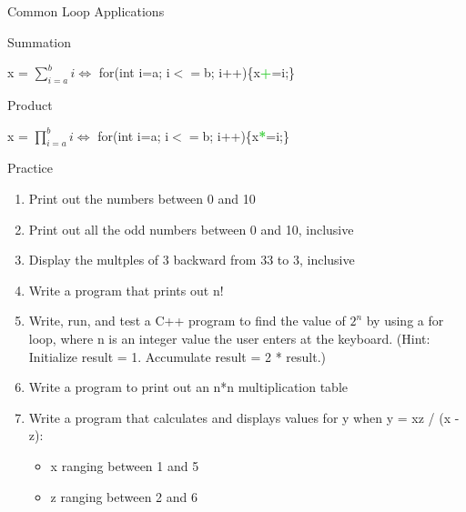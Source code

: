 \documentclass[xcolor={dvipsnames}]{beamer}
\begin{document}
\begin{frame}{Common Loop Applications}
\Large
	\begin{block}{Summation}
		\begin{center}
		x = $\displaystyle \sum^{b}_{i=a} i \Leftrightarrow$ for(int i=a; i$<=$b; i++)\{x\textcolor{LimeGreen}{\textbf{+}}=i;\}
		\end{center}
	\end{block}
	\pause
	\begin{block}{Product}
		\begin{center}
		x = $\displaystyle \prod^{b}_{i=a} i \Leftrightarrow$ for(int i=a; i$<=$b; i++)\{x\textcolor{LimeGreen}{\textbf{*}}=i;\}
		\end{center}
	\end{block}
\end{frame}


\begin{frame}{Practice}
	\begin{enumerate}
		\item Print out the numbers between 0 and 10
		\item Print out all the odd numbers between 0 and 10, inclusive
		\item Display the multples of 3 backward from 33 to 3, inclusive
		\item Write a program that prints out n!
		\item Write, run, and test a C++ program to find the value of $2^{n}$ by using a for loop, where n is an integer value the user enters at the keyboard. (Hint: Initialize result = 1. Accumulate result = 2 * result.)
		\item Write a program to print out an n*n multiplication table
		\item Write a program that calculates and displays values for y when y = xz / (x - z):
			\begin{itemize}
				\item x ranging between 1 and 5 
				\item z ranging between 2 and 6
			\end{itemize}
	\end{enumerate}
\end{frame}
\end{document}
